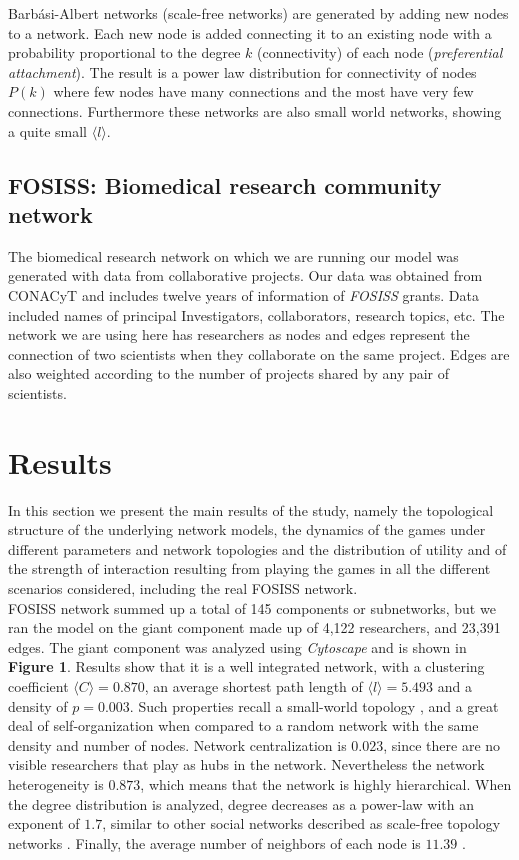 \documentclass{bmcart}
\begin{document}
Barb\'asi-Albert networks \cite{BarabasiAlbert:99} (scale-free
networks) are generated by adding new nodes to a network. Each new
node is added connecting it to an existing node with a probability
proportional to the degree $k$ (connectivity) of each node
(\textit{preferential attachment}). The result is a power law
distribution for connectivity of nodes $P(k)$ where few nodes have
many connections and the most have very few connections. Furthermore
these networks are also small world networks, showing a quite small
$\langle l \rangle$.


\subsection*{FOSISS: Biomedical research community network}

The biomedical research network on which we are running our model was
generated with data from collaborative projects. Our data was obtained
from CONACyT and includes twelve years of information of
\textit{FOSISS} grants. Data included names of principal
Investigators, collaborators, research topics, etc. The network we are
using here has researchers as nodes and edges represent the connection
of two scientists when they collaborate on the same project. Edges are
also weighted according to the number of projects shared by any pair
of scientists.

\section*{Results}

In this section we present the main results of the study, namely the
topological structure of the underlying network models, the dynamics
of the games under different parameters and network topologies and the
distribution of utility and of the strength of interaction resulting
from playing the games in all the different scenarios considered,
including the real FOSISS network.\\


FOSISS network summed up a total of 145 components or subnetworks, but
we ran the model on the giant component made up of 4,122 researchers,
and 23,391 edges.  The giant component was analyzed using
\textit{Cytoscape} and is shown in \textbf{Figure 1}. Results show
that it is a well integrated network, with a clustering coefficient
$\langle C \rangle = 0.870$, an average shortest path length of
$\langle l \rangle = 5.493$ and a density of $p = 0.003$. Such
properties recall a small-world topology \cite{WattsStrogatz:98}, and
a great deal of self-organization when compared to a random network
with the same density and number of nodes. Network centralization is
$0.023$, since there are no visible researchers that play as hubs in
the network. Nevertheless the network heterogeneity is $0.873$, which
means that the network is highly hierarchical. When the degree
distribution is analyzed, degree decreases as a power-law with an
exponent of $1.7$, similar to other social networks described as
scale-free topology networks \cite{BarabasiAlbert:99}. Finally, the
average number
of neighbors of each node is $11.39$ \cite{Shannon:2003}.\\
\end{document}
